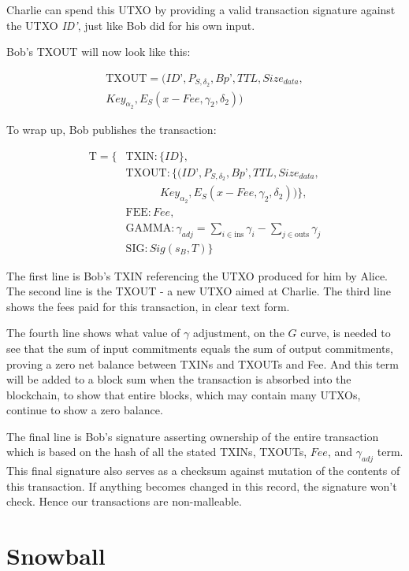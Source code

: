 \documentclass[8pt,fleqn,openany]{book}
\begin{document}
Charlie can spend this UTXO by providing a valid transaction signature against the UTXO \textit{ID’}, just like Bob did for his own input. 

Bob’s TXOUT will now look like this:

\begin{multline*}
\text{TXOUT} = (ID’, P_{S, \delta_2}, Bp’, TTL, Size_{data},\\ 
                Key_{\alpha_2}, E_S(x - Fee, \gamma_2, \delta_2))
\end{multline*}

To wrap up, Bob publishes the transaction:

\begin{align*}
\text{T} = \{&\text{TXIN} : \{\mathit{ID}\}, \\
 &\text{TXOUT} : \{(ID’, P_{S, \delta_2}, Bp’, TTL, Size_{data}, \\
 & \ \ \ \ \ \ \ \ \ \ \ \ \ \ Key_{\alpha_2}, E_S(x - Fee, \gamma_2, \delta_2))\}, \\
 &\text{FEE} : \mathit{Fee}, \\
 &\text{GAMMA} : \gamma_{\mathit{adj}} = \sum_{i \in \text{ins}}{\gamma_i} - \sum_{j \in \text{outs}}{\gamma_j}\\
 &\text{SIG} : \mathit{Sig}(s_B, T)\}
\end{align*}

The first line is Bob’s TXIN referencing the UTXO produced for him by Alice. The second line is the TXOUT - a new UTXO aimed at Charlie. The third line shows the fees paid for this transaction, in clear text form. 

The fourth line shows what value of $\gamma$ adjustment, on the $G$ curve, is needed to see that the sum of input commitments equals the sum of output commitments, proving a zero net balance between TXINs and TXOUTs and Fee. And this term will be added to a block sum when the transaction is absorbed into the blockchain, to show that entire blocks, which may contain many UTXOs, continue to show a zero balance.

The final line is Bob’s signature asserting ownership of the entire transaction which is based on the hash of all the stated TXINs, TXOUTs, $Fee$, and $\gamma_{adj}$ term. This final signature also serves as a checksum against mutation of the contents of this transaction. If anything becomes changed in this record, the signature won’t check. Hence our transactions are non-malleable.

\chapter{Snowball}\label{app:snowball}
\end{document}
